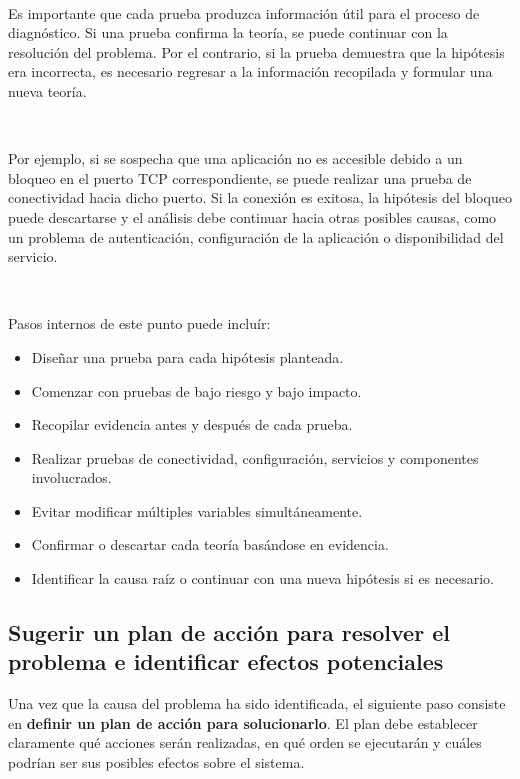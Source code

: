 \documentclass[a4paper,10pt]{article}
\begin{document}
\

Es importante que cada prueba produzca información útil para el proceso de diagnóstico. 
Si una prueba confirma la teoría, se puede continuar con la resolución del problema. Por el contrario, si la prueba demuestra que la hipótesis era incorrecta, es necesario regresar a la información recopilada y formular una nueva teoría.

\

Por ejemplo, si se sospecha que una aplicación no es accesible debido a un bloqueo en el puerto TCP correspondiente, 
se puede realizar una prueba de conectividad hacia dicho puerto. Si la conexión es exitosa, la hipótesis del bloqueo puede descartarse y el análisis debe continuar hacia otras posibles causas, como un problema de autenticación, 
configuración de la aplicación o disponibilidad del servicio.

\

Pasos internos de este punto puede incluír:

\begin{itemize}
    \item Diseñar una prueba para cada hipótesis planteada.
    \item Comenzar con pruebas de bajo riesgo y bajo impacto.
    \item Recopilar evidencia antes y después de cada prueba.
    \item Realizar pruebas de conectividad, configuración, servicios y componentes involucrados.
    \item Evitar modificar múltiples variables simultáneamente.
    \item Confirmar o descartar cada teoría basándose en evidencia.
    \item Identificar la causa raíz o continuar con una nueva hipótesis si es necesario.
\end{itemize}


\subsection{Sugerir un plan de acción para resolver el problema e identificar efectos potenciales}
Una vez que la causa del problema ha sido identificada, el siguiente paso consiste en \textbf{definir un plan de acción para solucionarlo}. 
El plan debe establecer claramente qué acciones serán realizadas, en qué orden se ejecutarán y cuáles podrían ser sus posibles efectos sobre el sistema.

\
\end{document}

